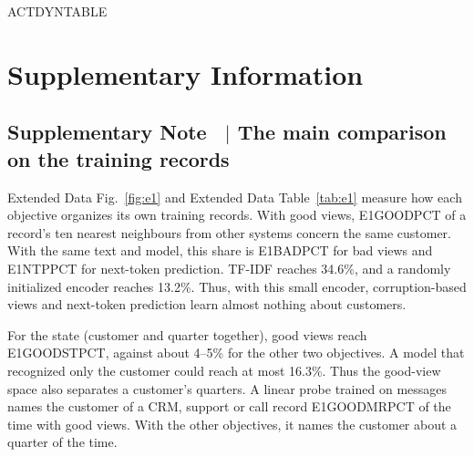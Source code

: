 \documentclass[11pt]{article}
\renewcommand{\figurename}{Fig.}
\newcounter{suppnote}
\newcommand{\suppnote}[2]{\refstepcounter{suppnote}\label{#2}\subsection{Supplementary Note \thesuppnote\ $|$ #1}}
\newcommand{\sisection}{\clearpage\setcounter{figure}{0}\setcounter{table}{0}%
  \renewcommand{\figurename}{Supplementary Fig.}\renewcommand{\tablename}{Supplementary Table}%
  \renewcommand{\theHfigure}{S\arabic{figure}}\renewcommand{\theHtable}{S\arabic{table}}}
\begin{document}
\begin{table}[h]
\centering
\small
\caption{\textbf{Decisions and dynamics} (ACTTRANS month-to-month transitions of the 21 customers in the day-2 corpus, frozen day-1 encoders, one run, leave-one-customer-out evaluation). Top: squared error of next month's state in the first 32 principal components, relative to a no-change prediction (negative is better), with the ridge strength from nested validation. ``Shrink'' moves this month's state toward the mean by one fitted factor. ``State'' predicts the change from this month's state alone, and the next two columns add this month's six actions, actual and shuffled across months. The last two add next month's actions, which next month's state itself contains, and next month's mix of systems, each system's share of next month's records. Bottom: next month's outcomes from the first 16 components of this month's state, with and without this month's actions ($^{*}$: the gain's 95\% interval over customers excludes zero). ``Actions alone'' is a model of the six indicators, held out the same way, and the last row scores the support-reply indicator itself.}
\label{tab:actions}
ACTDYNTABLE
\end{table}

\sisection
\section{Supplementary Information}

\suppnote{The main comparison on the training records}{sec:e1}
Extended Data Fig.~\ref{fig:e1} and Extended Data Table~\ref{tab:e1} measure how each objective organizes its own training records. With good views, E1GOODPCT of a record's ten nearest neighbours from other systems concern the same customer. With the same text and model, this share is E1BADPCT for bad views and E1NTPPCT for next-token prediction. TF-IDF reaches 34.6\%, and a randomly initialized encoder reaches 13.2\%. Thus, with this small encoder, corruption-based views and next-token prediction learn almost nothing about customers.

For the state (customer and quarter together), good views reach E1GOODSTPCT, against about 4--5\% for the other two objectives. A model that recognized only the customer could reach at most 16.3\%. Thus the good-view space also separates a customer's quarters. A linear probe trained on messages names the customer of a CRM, support or call record E1GOODMRPCT of the time with good views. With the other objectives, it names the customer about a quarter of the time.
\end{document}

